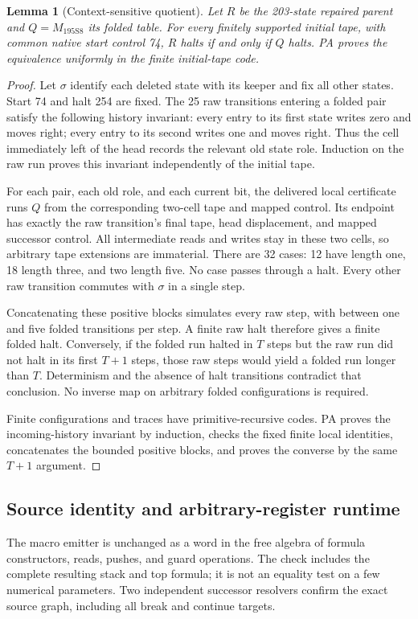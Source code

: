 \documentclass[11pt,letterpaper]{article}
\newtheorem{lemma}[theorem]{Lemma}
\newcommand{\Mnew}{M_{\mathrm{195S8}}}
\begin{document}
\begin{lemma}[Context-sensitive quotient]
\label{lem:quotient}
Let $R$ be the 203-state repaired parent and $Q=\Mnew$ its folded table.
For every finitely supported initial tape, with common native start
control 74, $R$ halts if and only if $Q$ halts. PA proves the equivalence
uniformly in the finite initial-tape code.
\end{lemma}
\begin{proof}
Let $\sigma$ identify each deleted state with its keeper and fix all
other states. Start 74 and halt 254 are fixed. The 25 raw transitions
entering a folded pair satisfy the following history invariant: every
entry to its first state writes zero and moves right; every entry to
its second writes one and moves right. Thus the cell immediately left
of the head records the relevant old state role. Induction on the raw
run proves this invariant independently of the initial tape.

For each pair, each old role, and each current bit, the delivered local
certificate runs $Q$ from the corresponding two-cell tape and mapped
control. Its endpoint has exactly the raw transition's final tape,
head displacement, and mapped successor control. All intermediate
reads and writes stay in these two cells, so arbitrary tape extensions
are immaterial. There are 32 cases: 12 have length one, 18 length three,
and two length five. No case passes through a halt. Every other raw
transition commutes with $\sigma$ in a single step.

Concatenating these positive blocks simulates every raw step, with
between one and five folded transitions per step. A finite raw halt
therefore gives a finite folded halt.
Conversely, if the folded run halted in $T$ steps but the raw run did
not halt in its first $T+1$ steps, those raw steps would yield a folded
run longer than $T$. Determinism and the absence of halt transitions
contradict that conclusion. No inverse map on arbitrary folded
configurations is required.

Finite configurations and traces have primitive-recursive codes.
PA proves the incoming-history invariant by induction, checks the fixed
finite local identities, concatenates the bounded positive blocks,
and proves the converse by the same $T+1$ argument.
\end{proof}

\subsection{Source identity and arbitrary-register runtime}
The macro emitter is unchanged as a word in the free algebra of
formula constructors, reads, pushes, and guard operations.
The check includes the complete resulting stack and top formula;
it is not an equality test on a few numerical parameters.
Two independent successor resolvers confirm the exact source graph,
including all break and continue targets.
\end{document}
